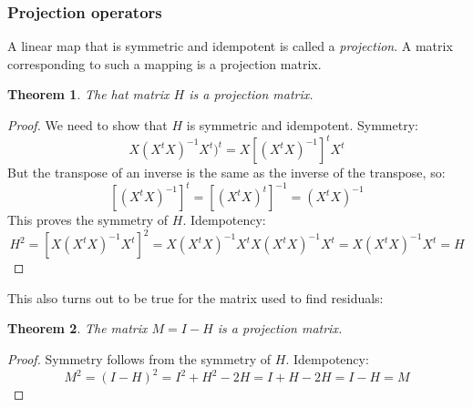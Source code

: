 \documentclass[12pt, a4paper]{article}
\newtheorem{theorem}{Theorem}
\begin{document}
\subsubsection{Projection operators}
A linear map that is symmetric and idempotent is called a \textit{projection}. A matrix corresponding to such a mapping is a projection matrix.

\begin{theorem}
The hat matrix $H$ is a projection matrix.
\end{theorem}
\begin{proof}
We need to show that $H$ is symmetric and idempotent. Symmetry:
\begin{equation}
X(X^t X)^{-1}X^t)^t=X\left[(X^t X)^{-1}\right]^t X^t
\end{equation}
But the transpose of an inverse is the same as the inverse of the transpose, so:
\begin{equation}
\left[(X^t X)^{-1}\right]^t=\left[(X^t X)^t\right]^{-1}=(X^t X)^{-1}
\end{equation}
This proves the symmetry of $H$. Idempotency:
\begin{equation}
H^2=\left[X(X^t X)^{-1}X^t\right]^2=X(X^t X)^{-1}X^tX(X^t X)^{-1}X^t=X(X^t X)^{-1}X^t=H
\end{equation}
\end{proof}

This also turns out to be true for the matrix used to find residuals:

\begin{theorem}
The matrix $M=I-H$ is a projection matrix.
\end{theorem}
\begin{proof}
Symmetry follows from the symmetry of $H$. Idempotency:
\begin{equation}
M^2=(I-H)^2=I^2+H^2-2H=I+H-2H=I-H=M
\end{equation}
\end{proof}
\end{document}
